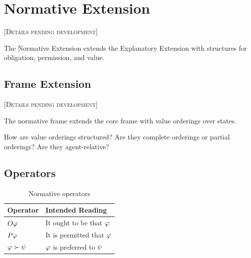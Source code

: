 \documentclass[../LogosReference.tex]{subfiles}
\begin{document}

\section{Normative Extension}\label{sec:normative}

\textsc{[Details pending development]}

The Normative Extension extends the Explanatory Extension with structures for obligation, permission, and value.


\subsection{Frame Extension}\label{sec:normative-frame}

\textsc{[Details pending development]}

The normative frame extends the core frame with value orderings over states.

\begin{question}
How are value orderings structured?
Are they complete orderings or partial orderings?
Are they agent-relative?
\end{question}


\subsection{Operators}\label{sec:normative-operators}

\begin{table}[h]
\centering
\begin{tabular}{ll}
\toprule
\textbf{Operator} & \textbf{Intended Reading} \\
\midrule
$O \varphi$ & It ought to be that $\varphi$ \\
$P \varphi$ & It is permitted that $\varphi$ \\
$\varphi \succ \psi$ & $\varphi$ is preferred to $\psi$ \\
\bottomrule
\end{tabular}
\caption{Normative operators}
\label{tab:normative-operators}
\end{table}
\end{document}
